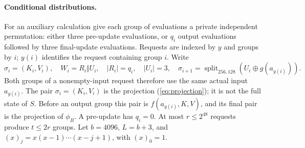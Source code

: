 \documentclass[journal=tosc,preprint,floatrow,nohyperxmp]{iacrtrans}
\numberwithin{lemma}{section}
\numberwithin{proposition}{section}
\newcommand{\fall}[2]{(#1)_{#2}}
\numberwithin{equation}{section}
\theoremstyle{definition}
\numberwithin{definition}{section}
\theoremstyle{plain}
\begin{document}
\paragraph{Conditional distributions.}
For an auxiliary calculation give each group of evaluations a private independent permutation: either three pre-update evaluations, or $q_i$ output evaluations followed by three final-update evaluations. Requests are indexed by $y$ and groups by $i$; $y(i)$ identifies the request containing group $i$. Write
\[
 \sigma_i=(K_i,V_i),\quad W_i=R_i\Vert U_i,\quad |R_i|=q_i,\quad |U_i|=3,
 \quad \sigma_{i+1}=\operatorname{split}_{256,128}(U_i\oplus g(a_{y(i)})).
\]
Both groups of a nonempty-input request therefore use the same actual input $a_{y(i)}$. The pair $\sigma_i=(K_i,V_i)$ is the projection (\ref{eq:projection}); it is not the full state of $S$. Before an output group this pair is $f(a_{y(i)},K,V)$, and its final pair is the projection of $\phi_B$. A pre-update has $q_i=0$. At most $r\le2^{48}$ requests produce $t\le2r$ groups. Let $b=4096$, $L=b+3$, and $\fall{x}{j}=x(x-1)\cdots(x-j+1)$, with $\fall{x}{0}=1$.
\end{document}
